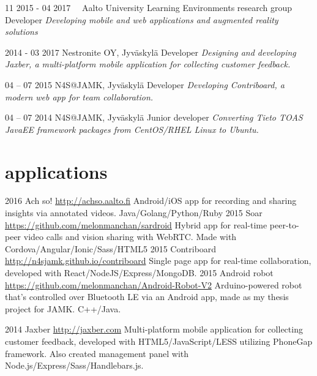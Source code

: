 \documentclass[]{friggeri-cv}
\begin{document}
\begin{entrylist}
  \entry
    {11 2015 - 04 2017~~}
    {Aalto University Learning Environments research group}
    {Developer}
    {\emph{Developing mobile and web applications and augmented reality solutions}}

  \entry
    {2014 - 03 2017}
    {Nestronite OY, Jyväskylä}
    {Developer}
    {\emph{Designing and developing Jaxber, a multi-platform mobile application for collecting customer feedback.}}

    \entry
    {04 – 07 2015}
    {N4S@JAMK, Jyväskylä}
    {Developer}
    {\emph{Developing Contriboard, a modern web app for team collaboration.}}

  \entry
    {04 – 07 2014}
    {N4S@JAMK, Jyväskylä}
    {Junior developer}
    {\emph{Converting Tieto TOAS JavaEE framework packages from CentOS/RHEL Linux to Ubuntu.}}

\end{entrylist}

\section{applications}

\begin{entrylist}
  \entry
    {2016}
    {Ach so!}
    {\href{http://achso.aalto.fi}{http://achso.aalto.fi}}
    {Android/iOS app for recording and sharing insights via annotated videos. Java/Golang/Python/Ruby}
  \entry
    {2015}
    {Soar}
    {\href{https://github.com/melonmanchan/sardroid}{https://github.com/melonmanchan/sardroid}}
    {Hybrid app for real-time peer-to-peer video calls and vision sharing with WebRTC. Made with Cordova/Angular/Ionic/Sass/HTML5}
  \entry
    {2015}
    {Contriboard}
    {\href{http://n4sjamk.github.io/contriboard/}{http://n4sjamk.github.io/contriboard}}
    {Single page app for real-time collaboration, developed with React/NodeJS/Express/MongoDB.}
  \entry
    {2015}
    {Android robot}
    {\href{https://github.com/melonmanchan/Android-Robot-V2}{https://github.com/melonmanchan/Android-Robot-V2}}
    {Arduino-powered robot that's controlled over Bluetooth LE via an Android app, made as my thesis project for JAMK. C++/Java.}

  \entry
    {2014}
    {Jaxber}
    {\href{http://jaxber.com}{http://jaxber.com}}
    {Multi-platform mobile application for collecting customer feedback, developed with HTML5/JavaScript/LESS utilizing PhoneGap framework. Also created management panel with Node.js/Express/Sass/Handlebars.js.}
\end{entrylist}
\end{document}
